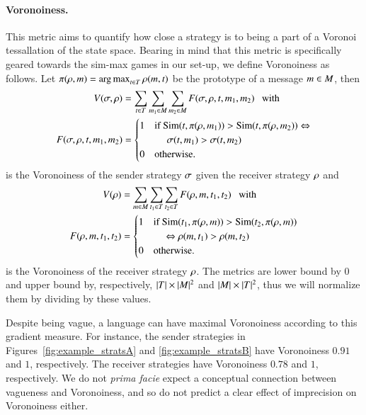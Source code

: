 \paragraph{Voronoiness.}
This metric aims to quantify how close a strategy is to being a part
of a Voronoi tessallation of the state space. Bearing in mind that
this metric is specifically geared towards the sim-max games in our
set-up, we define Voronoiness as follows. Let $\pi(\rho, m) =
\operatorname*{arg\,max}_{t \in T}\rho(m,t)$ be the prototype
of a message $m \in M$, then
\begin{align*}
  V(\sigma, \rho) & = \sum_{t \in T} \sum_{m_1 \in
    M} \sum_{m_2 \in M} F(\sigma, \rho, t,
  m_1, m_2) \text{\ \ \ with } \\
  F(\sigma, \rho, t,
  m_1, m_2) & =
  \begin{cases}
    1 & \text{if } \mathrm{Sim}(t, \pi(\rho, m_1)) >
    \mathrm{Sim}(t, \pi(\rho, m_2)) \Leftrightarrow \\
    &  \ \ \ \ \ \sigma(t, m_1) >
    \sigma(t, m_2) \\
    0 & \text{otherwise.}
  \end{cases}
\end{align*}
is the Voronoiness of the sender strategy $\sigma$ given the receiver
strategy $\rho$ and
\begin{align*}
  V(\rho) & = \sum_{m \in
    M} \sum_{t_1 \in T}  \sum_{t_2 \in T}
  F(\rho, m, t_1, t_2) \text{\ \ \ with } \\
  F(\rho, m, t_1, t_2) & =
  \begin{cases}
    1 & \text{if } \mathrm{Sim}(t_1, \pi(\rho,
  m)) > \mathrm{Sim}(t_2, \pi(\rho, m)) \\
  & \ \ \ \ \ \Leftrightarrow \rho(m,
  t_1) > \rho(m, t_2) \\
    0 & \text{otherwise.}
  \end{cases}
\end{align*}
is the Voronoiness of the receiver strategy $\rho$.  The metrics
are lower bound by $0$ and upper bound by, respectively, $|T|
\times |M|^2$ and $|M| \times |T|^2$, thus we will
normalize them by dividing by these values.

Despite being vague, a language can have maximal Voronoiness according
to this gradient measure. For instance, the sender strategies in
Figures~\ref{fig:example_stratsA} and \ref{fig:example_stratsB} have
Voronoiness $0.91$ and $1$, respectively. The receiver strategies have
Voronoiness $0.78$ and $1$, respectively. We do not \emph{prima facie}
expect a conceptual connection between vagueness and Voronoiness, and
so do not predict a clear effect of imprecision on Voronoiness either.


